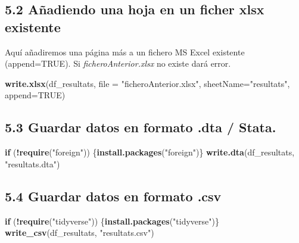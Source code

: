 \documentclass[
]{article}
\newenvironment{Shaded}{\begin{snugshade}}{\end{snugshade}}
\newcommand{\AttributeTok}[1]{\textcolor[rgb]{0.13,0.29,0.53}{#1}}
\newcommand{\ConstantTok}[1]{\textcolor[rgb]{0.56,0.35,0.01}{#1}}
\newcommand{\ControlFlowTok}[1]{\textcolor[rgb]{0.13,0.29,0.53}{\textbf{#1}}}
\newcommand{\FunctionTok}[1]{\textcolor[rgb]{0.13,0.29,0.53}{\textbf{#1}}}
\newcommand{\NormalTok}[1]{#1}
\newcommand{\SpecialCharTok}[1]{\textcolor[rgb]{0.81,0.36,0.00}{\textbf{#1}}}
\newcommand{\StringTok}[1]{\textcolor[rgb]{0.31,0.60,0.02}{#1}}
\begin{document}
\hypertarget{auxf1adiendo-una-hoja-en-un-ficher-xlsx-existente}{%
\subsection{5.2 Añadiendo una hoja en un ficher xlsx
existente}\label{auxf1adiendo-una-hoja-en-un-ficher-xlsx-existente}}

Aquí añadiremos una página más a un fichero MS Excel existente
(append=TRUE). Si \emph{ficheroAnterior.xlsx} no existe dará error.

\begin{Shaded}
\begin{Highlighting}[]
\FunctionTok{write.xlsx}\NormalTok{(df\_resultats, }\AttributeTok{file =} \StringTok{"ficheroAnterior.xlsx"}\NormalTok{, }\AttributeTok{sheetName=}\StringTok{"resultats"}\NormalTok{, }\AttributeTok{append=}\ConstantTok{TRUE}\NormalTok{)}
\end{Highlighting}
\end{Shaded}

\hypertarget{guardar-datos-en-formato-.dta-stata.}{%
\subsection{5.3 Guardar datos en formato .dta /
Stata.}\label{guardar-datos-en-formato-.dta-stata.}}

\begin{Shaded}
\begin{Highlighting}[]
\ControlFlowTok{if}\NormalTok{ (}\SpecialCharTok{!}\FunctionTok{require}\NormalTok{(}\StringTok{"foreign"}\NormalTok{)) \{}\FunctionTok{install.packages}\NormalTok{(}\StringTok{"foreign"}\NormalTok{)\}}
\FunctionTok{write.dta}\NormalTok{(df\_resultats, }\StringTok{"resultats.dta"}\NormalTok{)}
\end{Highlighting}
\end{Shaded}

\hypertarget{guardar-datos-en-formato-.csv}{%
\subsection{5.4 Guardar datos en formato
.csv}\label{guardar-datos-en-formato-.csv}}

\begin{Shaded}
\begin{Highlighting}[]
\ControlFlowTok{if}\NormalTok{ (}\SpecialCharTok{!}\FunctionTok{require}\NormalTok{(}\StringTok{"tidyverse"}\NormalTok{)) \{}\FunctionTok{install.packages}\NormalTok{(}\StringTok{"tidyverse"}\NormalTok{)\}}
\FunctionTok{write\_csv}\NormalTok{(df\_resultats, }\StringTok{"resultats.csv"}\NormalTok{)}
\end{Highlighting}
\end{Shaded}
\end{document}
